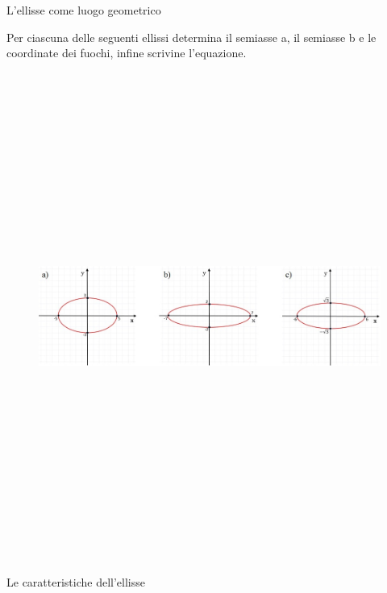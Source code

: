 L'ellisse come luogo geometrico
\begin{esercizio}
  \label{ese:div.003}
  Per ciascuna delle seguenti ellissi determina il semiasse a, il 
semiasse b e le coordinate dei fuochi, infine scrivine l'equazione.
\begin{figure}[htbp]
  \centering%
  \includegraphics[height=16cm, width=12cm, keepaspectratio] {img/ellissi3.jpg}%
\end{figure}
\end{esercizio}
Le caratteristiche dell'ellisse\\

